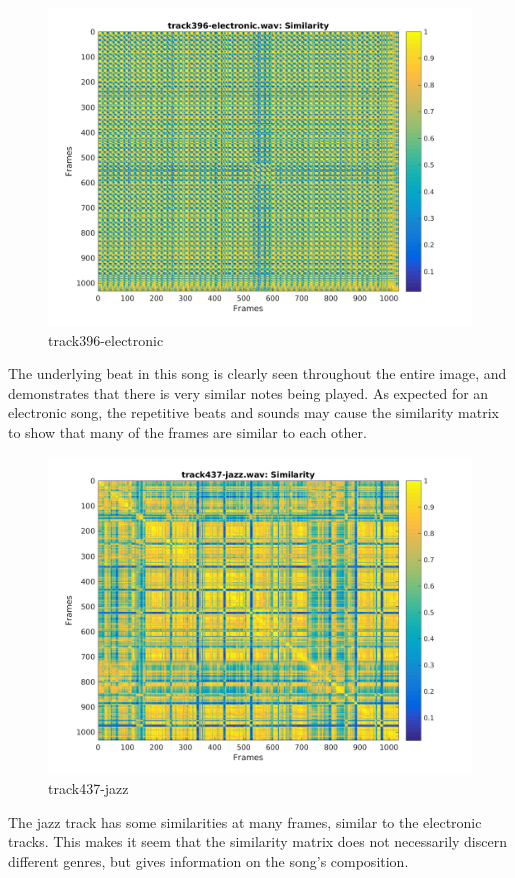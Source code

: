 \documentclass[11pt, a4paper]{article}
\begin{document}
\begin{figure}[H]
    \centering
    \includegraphics[width=.8\textwidth]{track396-electronic-similarity.png}
    \caption{track396-electronic}
\end{figure}

The underlying beat in this song is clearly seen throughout the entire image, and demonstrates that there is very similar notes being played. As expected for an electronic song, the repetitive beats and sounds may cause the similarity matrix to show that many of the frames are similar to each other.

\begin{figure}[H]
    \centering
    \includegraphics[width=.8\textwidth]{track437-jazz-similarity.png}
    \caption{track437-jazz}
\end{figure}

The jazz track has some similarities at many frames, similar to the electronic tracks. This makes it seem that the similarity matrix does not necessarily discern different genres, but gives information on the song's composition.
\end{document}

